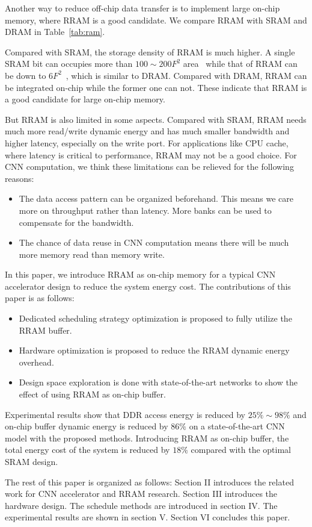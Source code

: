 Another way to reduce off-chip data transfer is to implement large on-chip memory, where RRAM is a good candidate. We compare RRAM with SRAM and DRAM in Table~\ref{tab:ram}.



Compared with SRAM, the storage density of RRAM is much higher. A single SRAM bit can occupies more than $100\sim 200F^2$ area~\cite{ee598} while that of RRAM can be down to $6F^2$~\cite{fackenthal201419}, which is similar to DRAM. Compared with DRAM, RRAM can be integrated on-chip while the former one can not. These indicate that RRAM is a good candidate for large on-chip memory.

But RRAM is also limited in some aspects. Compared with SRAM, RRAM needs much more read/write dynamic energy and has much smaller bandwidth and higher latency, especially on the write port. For applications like CPU cache, where latency is critical to performance, RRAM may not be a good choice. For CNN computation, we think these limitations can be relieved for the following reasons:
\begin{itemize}
\item {The data access pattern can be organized beforehand. This means we care more on throughput rather than latency. More banks can be used to compensate for the bandwidth.}
\item {The chance of data reuse in CNN computation means there will be much more memory read than memory write.}
\end{itemize}

In this paper, we introduce RRAM as on-chip memory for a typical CNN accelerator design to reduce the system energy cost. The contributions of this paper is as follows:
\begin{itemize}
\item {Dedicated scheduling strategy optimization is proposed to fully utilize the RRAM buffer.}
\item {Hardware optimization is proposed to reduce the RRAM dynamic energy overhead.}
\item {Design space exploration is done with state-of-the-art networks to show the effect of using RRAM as on-chip buffer.}
\end{itemize}
Experimental results show that DDR access energy is reduced by $25\%\sim 98\%$ and on-chip buffer dynamic energy is reduced by $86\%$ on a state-of-the-art CNN model with the proposed methods. Introducing RRAM as on-chip buffer, the total energy cost of the system is reduced by $18\%$ compared with the optimal SRAM design.

The rest of this paper is organized as follows: Section II introduces the related work for CNN accelerator and RRAM research. Section III introduces the hardware design. The schedule methods are introduced in section IV. The experimental results are shown in section V. Section VI concludes this paper.
